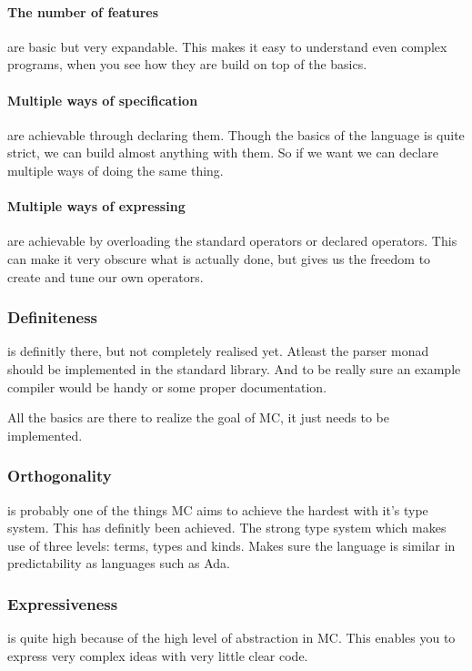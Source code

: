 \begin{multicols}{2}
\paragraph{The number of features}
are basic but very expandable.
This makes it easy to understand even complex programs, when you see how they are build on top of the basics.

\paragraph{Multiple ways of specification}
are achievable through declaring them.
Though the basics of the language is quite strict, we can build almost anything with them.
So if we want we can declare multiple ways of doing the same thing.

\paragraph{Multiple ways of expressing}
are achievable by overloading the standard operators or declared operators.
This can make it very obscure what is actually done, but gives us the freedom to create and tune our own operators.

\subsubsection{Definiteness}
is definitly there, but not completely realised yet.
Atleast the parser monad should be implemented in the standard library.
And to be really sure an example compiler would be handy or some proper documentation.

All the basics are there to realize the goal of MC, it just needs to be implemented.

\subsubsection{Orthogonality}
is probably one of the things MC aims to achieve the hardest with it's type system.
This has definitly been achieved.
The strong type system which makes use of three levels: terms, types and kinds.
Makes sure the language is similar in predictability as languages such as Ada.

\subsubsection{Expressiveness}
is quite high because of the high level of abstraction in MC.
This enables you to express very complex ideas with very little clear code.


\end{multicols}
